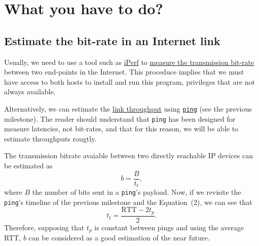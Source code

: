 \section{What you have to do?}

\subsection{Estimate the bit-rate in an Internet link}

Usually, we need to use a tool such as \href{https://iperf.fr/}{iPerf}
to
\href{https://en.wikipedia.org/wiki/Measuring_network_throughput}{measure
  the transmission bit-rate} between two end-points in the
Internet. This proceduce implies that we must have access to both
hosts to install and run this program, privileges that are not always
available.

Alternatively, we can estimate the
\href{https://en.wikipedia.org/wiki/Throughput}{link throughput} using
\href{https://github.com/torvalds/linux/blob/master/net/ipv4/ping.c}{\texttt{ping}}
(see the previous milestone). The reader should understand that
\texttt{ping} has been designed for measure latencies, not bit-rates,
and that for this reason, we will be able to estimate throughputs
rougtly.

The transmission bitrate avaiable between two directly reachable IP
devices can be estimated as
\begin{equation}
  b=\frac{B}{t_t},
  \label{eq:b}
\end{equation}
where $B$ the number of bits sent in a \texttt{ping}'s payload. Now,
if we revisite the \texttt{ping}'s timeline of the previous milestone
and the Equation~(2), we can see that
\begin{equation}
  t_t = \frac{\text{RTT}-2t_p}{2}.
  \label{eq:tt}
\end{equation}
Therefore, supposing that $t_p$ is constant between pings and using
the average RTT, $b$ can be considered as a good estimation of the
near future.

